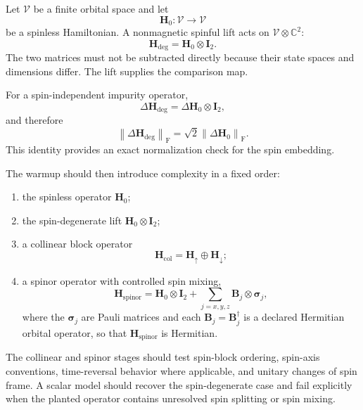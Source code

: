 Let $\mathcal V$ be a finite orbital space and let
\begin{equation}
    \mathbf H_0:\mathcal V\longrightarrow\mathcal V
\end{equation}
be a spinless Hamiltonian. A nonmagnetic spinful lift acts on
$\mathcal V\otimes\mathbb C^2$:
\begin{equation}
    \mathbf H_{\mathrm{deg}}
    =
    \mathbf H_0\otimes\mathbf I_2.
\end{equation}
The two matrices must not be subtracted directly because their state spaces and
dimensions differ. The lift supplies the comparison map.

For a spin-independent impurity operator,
\begin{equation}
    \Delta\mathbf H_{\mathrm{deg}}
    =
    \Delta\mathbf H_0\otimes\mathbf I_2,
\end{equation}
and therefore
\begin{equation}
    \left\lVert
        \Delta\mathbf H_{\mathrm{deg}}
    \right\rVert_{\mathrm F}
    =
    \sqrt{2}
    \left\lVert
        \Delta\mathbf H_0
    \right\rVert_{\mathrm F}.
\end{equation}
This identity provides an exact normalization check for the spin embedding.

The warmup should then introduce complexity in a fixed order:
\begin{enumerate}
    \item the spinless operator $\mathbf H_0$;
    \item the spin-degenerate lift $\mathbf H_0\otimes\mathbf I_2$;
    \item a collinear block operator
          \begin{equation}
              \mathbf H_{\mathrm{col}}
              =
              \mathbf H_{\uparrow}
              \oplus
              \mathbf H_{\downarrow};
          \end{equation}
    \item a spinor operator with controlled spin mixing,
          \begin{equation}
              \mathbf H_{\mathrm{spinor}}
              =
              \mathbf H_0\otimes\mathbf I_2
              +
              \sum_{j=x,y,z}
              \mathbf B_j\otimes\boldsymbol\sigma_j,
          \end{equation}
          where the $\boldsymbol\sigma_j$ are Pauli matrices and each
          $\mathbf B_j=\mathbf B_j^\dagger$ is a declared Hermitian orbital
          operator, so that $\mathbf H_{\mathrm{spinor}}$ is Hermitian.
\end{enumerate}
The collinear and spinor stages should test spin-block ordering, spin-axis
conventions, time-reversal behavior where applicable, and unitary changes of
spin frame. A scalar model should recover the spin-degenerate case and fail
explicitly when the planted operator contains unresolved spin splitting or
spin mixing.

